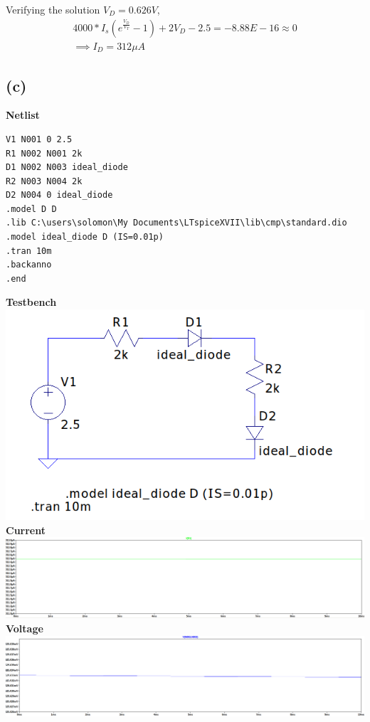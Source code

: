 \documentclass{article}
\begin{document}
 \newline
Verifying the solution $V_D=0.626V$,\\
\begin{gather*}
4000*I_s\left(e^{\frac{V_D}{V_T}} - 1\right) + 2V_D -2.5 = -8.88E-16 \approx 0\\
\implies I_D = 312{\mu}A
\end{gather*}
\subsection*{(c)}
\textbf{Netlist}\\
\begin{lstlisting}
V1 N001 0 2.5
R1 N002 N001 2k
D1 N002 N003 ideal_diode
R2 N003 N004 2k
D2 N004 0 ideal_diode
.model D D
.lib C:\users\solomon\My Documents\LTspiceXVII\lib\cmp\standard.dio
.model ideal_diode D (IS=0.01p)
.tran 10m
.backanno
.end
\end{lstlisting}
\textbf{Testbench}\\
\includegraphics[scale=0.5]{./figs/Q2_tb.png}\\
 \newline
\textbf{Current}\\
\includegraphics[scale=0.28]{./figs/Q2_c_i.png}
 \newline
\textbf{Voltage}\\
\includegraphics[scale=0.28]{./figs/Q2_c_v.png}
\end{document}
